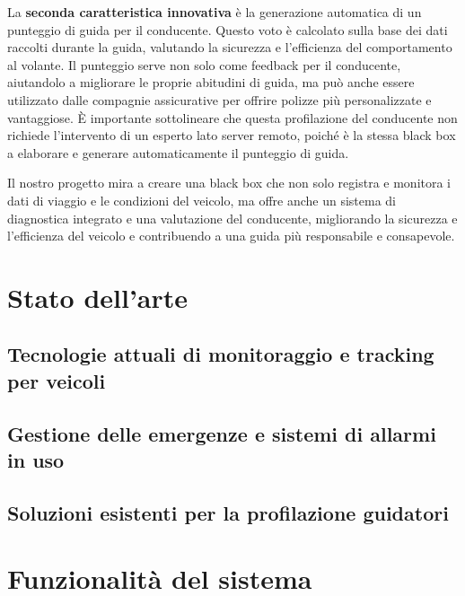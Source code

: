 \documentclass[12pt, a4paper, italian]{report}
\numberwithin{figure}{chapter}
\numberwithin{table}{chapter}
\begin{document}
La \textbf{seconda caratteristica innovativa} è la generazione automatica di un punteggio di guida per il conducente. Questo voto è calcolato sulla base dei dati raccolti durante la guida, valutando la sicurezza e l’efficienza del comportamento al volante. Il punteggio serve non solo come feedback per il conducente, aiutandolo a migliorare le proprie abitudini di guida, ma può anche essere utilizzato dalle compagnie assicurative per offrire polizze più personalizzate e vantaggiose. È importante sottolineare che questa profilazione del conducente non richiede l'intervento di un esperto lato server remoto, poiché è la stessa black box a elaborare e generare automaticamente il punteggio di guida.

Il nostro progetto mira a creare una black box che non solo registra e monitora i dati di viaggio e le condizioni del veicolo, ma offre anche un sistema di diagnostica integrato e una valutazione del conducente, migliorando la sicurezza e l’efficienza del veicolo e contribuendo a una guida più responsabile e consapevole.

\chapter{Stato dell'arte}
\section{Tecnologie attuali di monitoraggio e tracking per veicoli}
\section{Gestione delle emergenze e sistemi di allarmi in uso}
\section{Soluzioni esistenti per la profilazione guidatori}

\chapter{Funzionalità del sistema}
\end{document}
